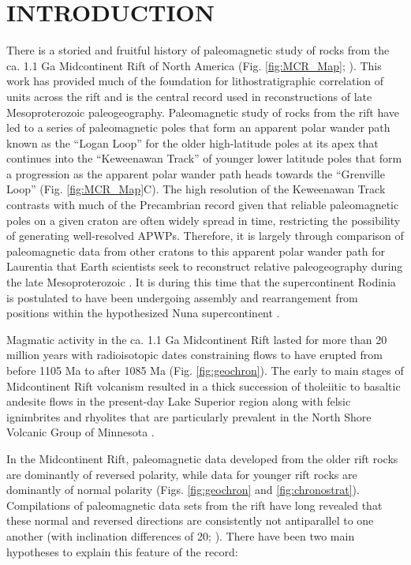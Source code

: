 \documentclass[11pt,letterpaper]{article}
\begin{document}
\section{INTRODUCTION}

There is a storied and fruitful history of paleomagnetic study of rocks from the ca. 1.1 Ga Midcontinent Rift of North America (Fig. \ref{fig:MCR_Map}; \citealp[e.g.,][]{Dubois1955a, Halls1982a}). This work has provided much of the foundation for lithostratigraphic correlation of units across the rift and is the central record used in reconstructions of late Mesoproterozoic paleogeography. Paleomagnetic study of rocks from the rift have led to a series of paleomagnetic poles that form an apparent polar wander path known as the ``Logan Loop'' for the older high-latitude poles at its apex that continues into the ``Keweenawan Track'' of younger lower latitude poles that form a progression as the apparent polar wander path heads towards the ``Grenville Loop'' (Fig. \ref{fig:MCR_Map}C). The high resolution of the Keweenawan Track contrasts with much of the Precambrian record given that reliable paleomagnetic poles on a given craton are often widely spread in time, restricting the possibility of generating well-resolved APWPs. Therefore, it is largely through comparison of paleomagnetic data from other cratons to this apparent polar wander path for Laurentia that Earth scientists seek to reconstruct relative paleogeography during the late Mesoproterozoic  \cite[e.g.,][]{Weil1998a,Li2008a,Evans2009a}. It is during this time that the supercontinent Rodinia is postulated to have been undergoing assembly and rearrangement from positions within the hypothesized Nuna supercontinent \citep{Evans2013b}.

Magmatic activity in the ca. 1.1 Ga Midcontinent Rift lasted for more than 20 million years with radioisotopic dates constraining flows to have erupted from before 1105 Ma to after 1085 Ma (Fig. \ref{fig:geochron}). The early to main stages of Midcontinent Rift volcanism resulted in a thick succession of tholeiitic to basaltic andesite flows in the present-day Lake Superior region along with felsic ignimbrites and rhyolites that are particularly prevalent in the North Shore Volcanic Group of Minnesota \citep{Green1989a}.

In the Midcontinent Rift, paleomagnetic data developed from the older rift rocks are dominantly of reversed polarity, while data for younger rift rocks are dominantly of normal polarity (Figs. \ref{fig:geochron} and \ref{fig:chronostrat}). Compilations of paleomagnetic data sets from the rift have long revealed that these normal and reversed directions are consistently not antiparallel to one another (with inclination differences of 20\textdegree; \citealp{Halls1982a}). There have been two main hypotheses to explain this feature of the record:
\end{document}
